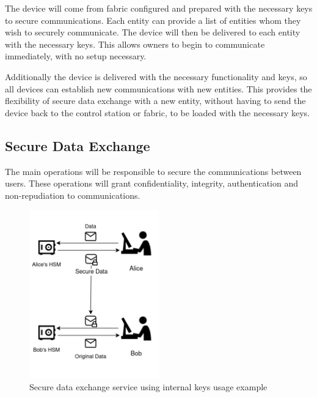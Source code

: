 The device will come from fabric configured and prepared with the necessary keys to secure communications.
Each entity can provide a list of entities whom they wish to securely communicate. The device will then be delivered to each entity with the necessary keys. This allows owners to begin to communicate immediately, with no setup necessary.

Additionally the device is delivered with the necessary functionality and keys, so all devices can establish new communications with new entities. This provides the flexibility of secure data exchange with a new entity, without having to send the device back to the control station or fabric, to be loaded with the necessary keys.

\subsection{Secure Data Exchange}\label{chap:arch:services:data}

The main operations will be responsible to secure the communications between users. These operations will grant confidentiality, integrity, authentication and non-repudiation to communications.

\begin{figure}[h]
    \centering
    \includegraphics[width=0.5\textwidth]{./Images/arch-data-service.png}
    \caption{Secure data exchange service using internal keys usage example}
    \label{fig:arch:data-service}
\end{figure}

